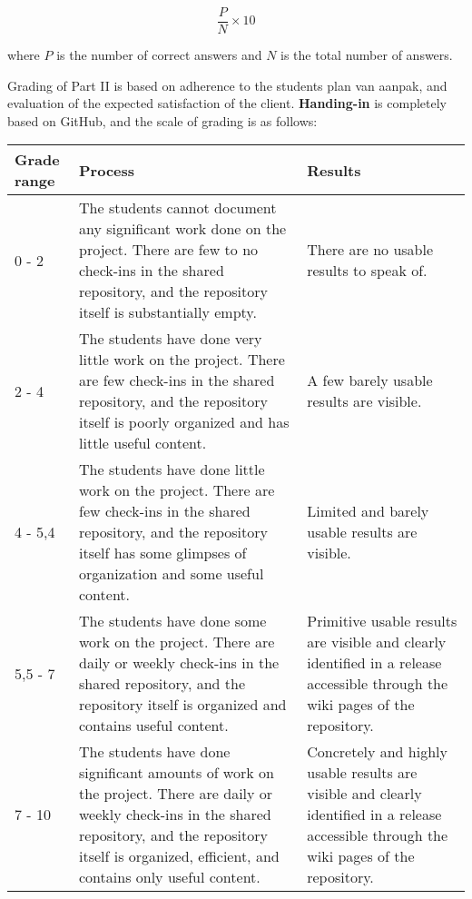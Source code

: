 			$$\frac{P}{N}\times 10$$
	
		where $P$ is the number of correct answers and $N$ is the total number of answers.
		
		Grading of Part II is based on adherence to the students plan van aanpak, and evaluation of the expected satisfaction of the client. \textbf{Handing-in} is completely based on GitHub, and the scale of grading is as follows:
		
		\begin{tabular}{| l | p{5cm} | | p{5cm}}
			\hline
			Grade range & Process & Results \\
			\hline
			0 - 2 & The students cannot document any significant work done on the project. There are few to no check-ins in the shared repository, and the repository itself is substantially empty. & There are no usable results to speak of. \\
			\hline
			2 - 4 & The students have done very little work on the project. There are few check-ins in the shared repository, and the repository itself is poorly organized and has little useful content. & A few barely usable results are visible. \\			
			\hline
			4 - 5,4 & The students have done little work on the project. There are few check-ins in the shared repository, and the repository itself has some glimpses of organization and some useful content. & Limited and barely usable results are visible. \\
			\hline
			5,5 - 7 & The students have done some work on the project. There are daily or weekly check-ins in the shared repository, and the repository itself is organized and contains useful content. & Primitive usable results are visible and clearly identified in a release accessible through the wiki pages of the repository. \\
			\hline
			7 - 10 & The students have done significant amounts of work on the project. There are daily or weekly check-ins in the shared repository, and the repository itself is organized, efficient, and contains only useful content. & Concretely and highly usable results are visible and clearly identified in a release accessible through the wiki pages of the repository. \\
		\end{tabular}		
